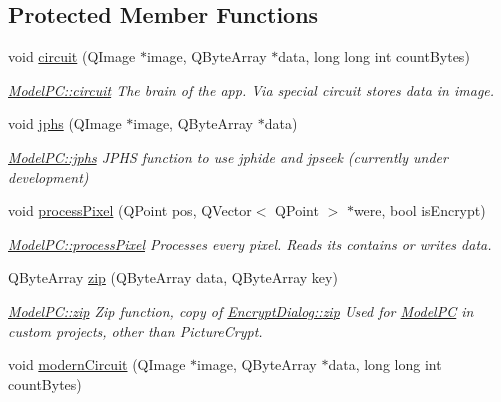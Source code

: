 \subsection*{Protected Member Functions}
\begin{DoxyCompactItemize}
\item 
void \hyperlink{class_model_p_c_a1d0091062a0c836b283ec2f67411623b}{circuit} (Q\-Image $\ast$image, Q\-Byte\-Array $\ast$data, long long int count\-Bytes)
\begin{DoxyCompactList}\small\item\em \hyperlink{class_model_p_c_a1d0091062a0c836b283ec2f67411623b}{Model\-P\-C\-::circuit} The brain of the app. Via special circuit stores data in image. \end{DoxyCompactList}\item 
void \hyperlink{class_model_p_c_a8bee0255c09449868c7e6097afaaf0cd}{jphs} (Q\-Image $\ast$image, Q\-Byte\-Array $\ast$data)
\begin{DoxyCompactList}\small\item\em \hyperlink{class_model_p_c_a8bee0255c09449868c7e6097afaaf0cd}{Model\-P\-C\-::jphs} J\-P\-H\-S function to use jphide and jpseek (currently under development) \end{DoxyCompactList}\item 
void \hyperlink{class_model_p_c_a1171f9fe1550133dc9053a46b4e5bcfd}{process\-Pixel} (Q\-Point pos, Q\-Vector$<$ Q\-Point $>$ $\ast$were, bool is\-Encrypt)
\begin{DoxyCompactList}\small\item\em \hyperlink{class_model_p_c_a1171f9fe1550133dc9053a46b4e5bcfd}{Model\-P\-C\-::process\-Pixel} Processes every pixel. Reads its contains or writes data. \end{DoxyCompactList}\item 
Q\-Byte\-Array \hyperlink{class_model_p_c_afebbbfa4b07deba4f68fc6dfb50f353f}{zip} (Q\-Byte\-Array data, Q\-Byte\-Array key)
\begin{DoxyCompactList}\small\item\em \hyperlink{class_model_p_c_afebbbfa4b07deba4f68fc6dfb50f353f}{Model\-P\-C\-::zip} Zip function, copy of \hyperlink{class_encrypt_dialog_a2bff820a3df4ddc36ecb07ed74b7138a}{Encrypt\-Dialog\-::zip} Used for \hyperlink{class_model_p_c}{Model\-P\-C} in custom projects, other than Picture\-Crypt. \end{DoxyCompactList}\item 
void \hyperlink{class_model_p_c_a670c3a08360555282adfd3740b2debac}{modern\-Circuit} (Q\-Image $\ast$image, Q\-Byte\-Array $\ast$data, long long int count\-Bytes)
\end{DoxyCompactItemize}


